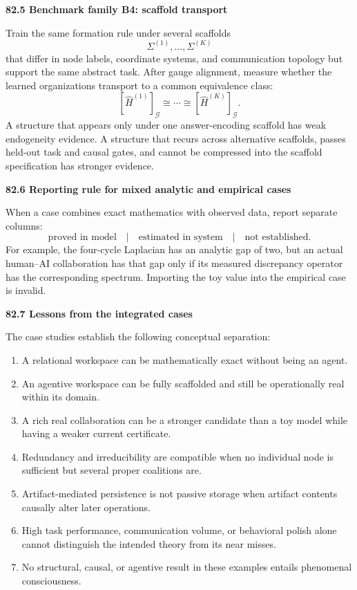 \documentclass[11pt,letterpaper]{article}
\newcommand{\subtopic}[1]{%
 \vspace{0.45em}
 {\bfseries\color{AccentColor} #1\par}
}
\theoremstyle{plain}
\theoremstyle{definition}
\begin{document}
\subtopic{82.5 Benchmark family B4: scaffold transport}

Train the same formation rule under several scaffolds
\[
\Sigma^{(1)},\ldots,\Sigma^{(K)}
\]
that differ in node labels, coordinate systems, and communication topology but
support the same abstract task. After gauge alignment, measure whether the
learned organizations transport to a common equivalence class:
\[
[\widehat H^{(1)}]_{\mathcal G}
\cong\cdots\cong
[\widehat H^{(K)}]_{\mathcal G}.
\]
A structure that appears only under one answer-encoding scaffold has weak
endogeneity evidence. A structure that recurs across alternative scaffolds,
passes held-out task and causal gates, and cannot be compressed into the
scaffold specification has stronger evidence.

\subtopic{82.6 Reporting rule for mixed analytic and empirical cases}

When a case combines exact mathematics with observed data, report separate
columns:
\[
\boxed{
\text{proved in model}
\quad\big|\quad
\text{estimated in system}
\quad\big|\quad
\text{not established}.
}
\]
For example, the four-cycle Laplacian has an analytic gap of two, but an actual
human--AI collaboration has that gap only if its measured discrepancy operator
has the corresponding spectrum. Importing the toy value into the empirical
case is invalid.

\subtopic{82.7 Lessons from the integrated cases}

The case studies establish the following conceptual separation:
\begin{enumerate}
\item A relational workspace can be mathematically exact without being an
 agent.
\item An agentive workspace can be fully scaffolded and still be operationally
 real within its domain.
\item A rich real collaboration can be a stronger candidate than a toy model
 while having a weaker current certificate.
\item Redundancy and irreducibility are compatible when no individual node is
 sufficient but several proper coalitions are.
\item Artifact-mediated persistence is not passive storage when artifact
 contents causally alter later operations.
\item High task performance, communication volume, or behavioral polish alone
 cannot distinguish the intended theory from its near misses.
\item No structural, causal, or agentive result in these examples entails
 phenomenal consciousness.
\end{enumerate}
\end{document}
